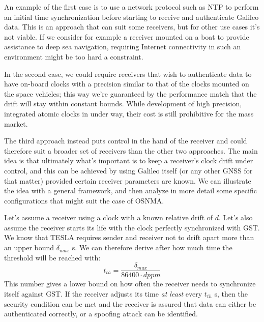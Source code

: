 \vspace{\baselineskip}

An example of the first case is to use a network protocol such as NTP to perform
an initial time synchronization before starting to receive and authenticate
Galileo data. This is an approach that can suit some receivers, but for other use
cases it's not viable. If we consider for example a receiver mounted on a boat
to provide assistance to deep sea navigation, requiring Internet connectivity in
such an environment might be too hard a constraint.

In the second case, we could require receivers that wish to authenticate data to
have on-board clocks with a precision similar to that of the clocks mounted on
the space vehicles; this way we're guaranteed by the performance match that the
drift will stay within constant bounds. While development of high precision,
integrated atomic clocks in under way, their cost is still prohibitive for the
mass market.

The third approach instead puts control in the hand of the receiver and could
therefore suit a broader set of receivers than the other two approaches. The
main idea is that ultimately what's important is to keep a receiver's clock
drift under control, and this can be achieved by using Galileo itself (or any
other GNSS for that matter) provided certain receiver parameters are known. We
can illustrate the idea with a general framework, and then analyze in more
detail some specific configurations that might suit the case of OSNMA.

\vspace{\baselineskip}

Let's assume a receiver using a clock with a known relative drift of $d$. Let's
also assume the receiver starts its life with the clock perfectly synchronized
with GST. We know that TESLA requires sender and receiver not to drift apart
more than an upper bound $\delta_{max}$ \si{s}. We can therefore derive after how much
time the threshold will be reached with:
\begin{equation}
  \label{eq:drift_threshold}
  t_{th} = \frac{\delta_{max}}{86400 \cdot d \si{ppm}}
\end{equation}
This number gives a lower bound on how often the receiver needs to synchronize
itself against GST. If the receiver adjusts its time \textit{at least} every
$t_{th}$ \si{s}, then the security condition can be met and the receiver is
assured that data can either be authenticated correctly, or a spoofing attack
can be identified.

